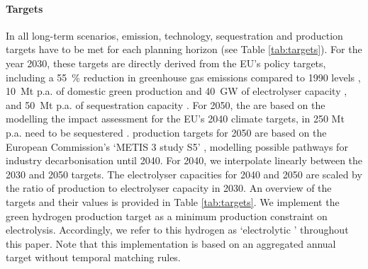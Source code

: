 \documentclass[preprint,12pt,sort&compress]{elsarticle}
\begin{document}
\paragraph{Targets}
\label{sec:targets}
In all long-term scenarios, emission, technology, sequestration and production targets have to be met for each planning horizon (see Table \ref{tab:targets}). For the year 2030, these targets are directly derived from the EU's policy targets, including a \SI{55}{\percent} reduction in greenhouse gas emissions compared to 1990 levels \cite{europeancommissionFit55Delivering2021}, \SI{10}{Mt} p.a. of domestic green  production \cite{europeancommissionREPowerEUPlanCommunication2022} and \SI{40}{GW} of electrolyser capacity \cite{europeancommissionCommunicationCommissionEuropean2020}, and \SI{50}{Mt} p.a. of  sequestration capacity \cite{europeanparliamentRegulationEU20242024}. For 2050, the  are based on the modelling the impact assessment for the EU's 2040 climate targets, in 250 Mt p.a. need to be sequestered \cite{europeancommissionCommunicationCommissionEuropean2024}.  production targets for 2050 are based on the European Commission's `METIS 3 study S5' \cite{europeancommission.directorategeneralforenergy.METIS3Study2023}, modelling possible pathways for industry decarbonisation until 2040. For 2040, we interpolate linearly between the 2030 and 2050 targets. The electrolyser capacities for 2040 and 2050 are scaled by the ratio of  production to electrolyser capacity in 2030. An overview of the targets and their values is provided in Table \ref{tab:targets}. We implement the green hydrogen production target as a minimum production constraint on electrolysis. Accordingly, we refer to this hydrogen as `electrolytic ' throughout this paper. Note that this implementation is based on an aggregated annual target without temporal matching rules.
\end{document}
